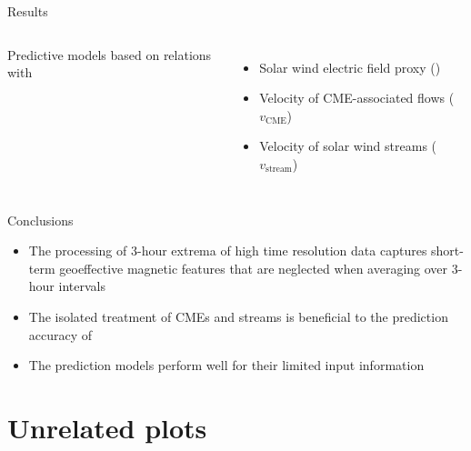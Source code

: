 \begin{frame}[plain,c]{Results}{}
	\begin{columns}[c]
	\column{\textwidth}
		
		Predictive \Kp{} models based on relations with
		\begin{itemize}%
			\item Solar wind electric field proxy (\vBz{})
			\item Velocity of CME-associated flows ($v_\text{CME}$)
			\item Velocity of solar wind streams ($v_\text{stream}$)
		\end{itemize}
		
	\end{columns}
\end{frame}
\begin{frame}[plain,c]{Conclusions}{}
		
		\begin{itemize}%
			\item The processing of 3-hour extrema of high time resolution data captures short-term geoeffective magnetic features that are neglected when averaging over 3-hour intervals
			\item The isolated treatment of CMEs and streams is beneficial to the prediction accuracy of \Kp{}
			\item The prediction models perform well for their limited input information
		\end{itemize}
		
	
	\vspace*{\fill} \hfill \hyperlink{prediction_performance}{}
\end{frame}

\section{Unrelated plots}

